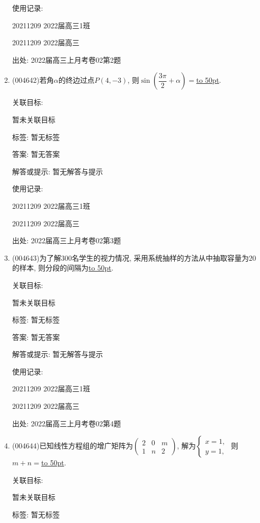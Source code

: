 \documentclass[10pt,a4paper]{article}
\newcommand{\blank}[1]{\underline{\hbox to #1pt{}}}
\begin{document}
\begin{enumerate}[1.]
使用记录:

20211209	2022届高三1班	

20211209	2022届高三	


出处: 2022届高三上月考卷02第2题
\item { (004642)}若角$\alpha$的终边过点$P(4,-3)$, 则$\sin(\dfrac{3\pi}2+\alpha)=$\blank{50}.


关联目标:

暂未关联目标



标签: 暂无标签

答案: 暂无答案

解答或提示: 暂无解答与提示

使用记录:

20211209	2022届高三1班	

20211209	2022届高三	


出处: 2022届高三上月考卷02第3题
\item { (004643)}为了解$300$名学生的视力情况, 采用系统抽样的方法从中抽取容量为$20$的样本, 则分段的间隔为\blank{50}.


关联目标:

暂未关联目标



标签: 暂无标签

答案: 暂无答案

解答或提示: 暂无解答与提示

使用记录:

20211209	2022届高三1班	

20211209	2022届高三	


出处: 2022届高三上月考卷02第4题
\item { (004644)}已知线性方程组的增广矩阵为$\begin{pmatrix}
2 & 0 & m  \\ 1 & n & 2  \end{pmatrix}$, 解为$\begin{cases}
x=1,  \\y=1,  \end{cases}$ 则$m+n=$\blank{50}.


关联目标:

暂未关联目标



标签: 暂无标签


\end{enumerate}
\end{document}
